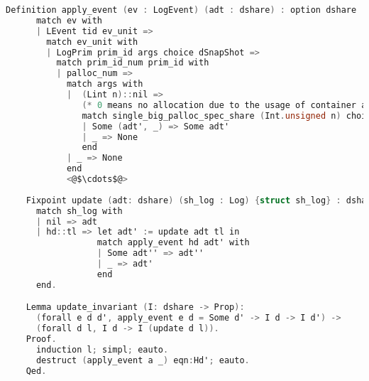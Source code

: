 \begin{lstlisting}[language=C]
    Definition apply_event (ev : LogEvent) (adt : dshare) : option dshare := 
      match ev with 
      | LEvent tid ev_unit =>
        match ev_unit with 
        | LogPrim prim_id args choice dSnapShot =>
          match prim_id_num prim_id with 
          | palloc_num =>
            match args with 
            |  (Lint n)::nil =>
               (* 0 means no allocation due to the usage of container and 1 means allocation trial happens *)
               match single_big_palloc_spec_share (Int.unsigned n) choice adt with 
               | Some (adt', _) => Some adt'
               | _ => None 
               end
            | _ => None
            end
            <@$\cdots$@>
            
    Fixpoint update (adt: dshare) (sh_log : Log) {struct sh_log} : dshare :=
      match sh_log with
      | nil => adt
      | hd::tl => let adt' := update adt tl in 
                  match apply_event hd adt' with 
                  | Some adt'' => adt'' 
                  | _ => adt' 
                  end
      end.

    Lemma update_invariant (I: dshare -> Prop):
      (forall e d d', apply_event e d = Some d' -> I d -> I d') ->
      (forall d l, I d -> I (update d l)).
    Proof.
      induction l; simpl; eauto.
      destruct (apply_event a _) eqn:Hd'; eauto.
    Qed.
\end{lstlisting}

